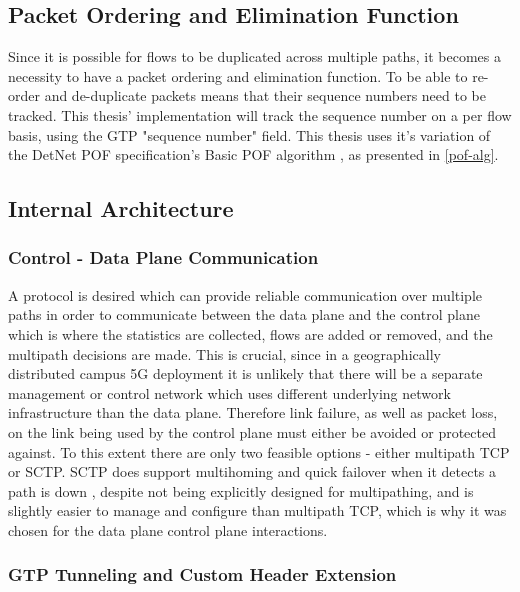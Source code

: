 \subsection{Packet Ordering and Elimination Function}

Since it is possible for flows to be duplicated across multiple paths, it becomes a necessity to have a packet ordering and elimination function. To be able to re-order and de-duplicate packets means that their sequence numbers need to be tracked. This thesis' implementation will track the sequence number on a per flow basis, using the GTP "sequence number" field. This thesis uses it's variation of the DetNet POF specification's Basic POF algorithm \cite{ietf-detnet-pof-08}, as presented in \ref{pof-alg}.

\subsection{Internal Architecture}

\subsubsection{Control - Data Plane Communication}

A protocol is desired which can provide reliable communication over multiple paths in order to communicate between the data plane and the control plane which is where the statistics are collected, flows are added or removed, and the multipath decisions are made. This is crucial, since in a geographically distributed campus 5G deployment it is unlikely that there will be a separate management or control network which uses different underlying network infrastructure than the data plane. Therefore link failure, as well as packet loss, on the link being used by the control plane must either be avoided or protected against. To this extent there are only two feasible options - either multipath TCP or SCTP. SCTP does support multihoming and quick failover when it detects a path is down \cite{sctp-spec, sctp-failover}, despite not being explicitly designed for multipathing, and is slightly easier to manage and configure than multipath TCP, which is why it was chosen for the data plane control plane interactions.

\subsubsection{GTP Tunneling and Custom Header Extension}

